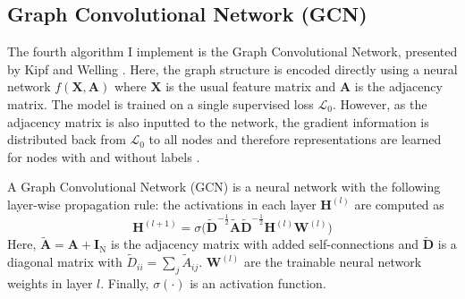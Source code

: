 \documentclass[12pt]{article}
\theoremstyle{definition}
\begin{document}
\subsection{Graph Convolutional Network (GCN)}
The fourth algorithm I implement is the Graph Convolutional Network, presented by Kipf and Welling \cite{kipf2017semi}. Here, the graph structure is encoded directly using a neural network $f(\mathbf{X}, \mathbf{A})$ where $\mathbf{X}$ is the usual feature matrix and $\mathbf{A}$ is the adjacency matrix. The model is trained on a single supervised loss $\mathcal{L}_0$. However, as the adjacency matrix is also inputted to the network, the gradient information is distributed back from $\mathcal{L}_0$ to all nodes and therefore representations are learned for nodes with and without labels \cite{kipf2017semi}.

\bigskip

A Graph Convolutional Network (GCN) is a neural network with the following layer-wise propagation rule: the activations in each layer $\mathbf{H}^{(l)}$ are computed as
\[
\mathbf{H}^{(l+1)} = \sigma \big( \tilde{\mathbf{D}}^{-\frac{1}{2}} \tilde{\mathbf{A}} \tilde{\mathbf{D}}^{-\frac{1}{2}} \mathbf{H}^{(l)} \mathbf{W}^{(l)}\big)
\]
Here, $\tilde{\mathbf{A}} = \mathbf{A} + \mathbf{I}_\textrm{N}$ is the adjacency matrix with added self-connections and $\tilde{\mathbf{D}}$ is a diagonal  matrix with $\tilde{D}_{ii} = \sum_{j} \tilde{A}_{ij}$. $\mathbf{W}^{(l)}$ are the trainable neural network weights in layer $l$. Finally, $\sigma(\cdot)$ is an activation function.

\bigskip
\end{document}

